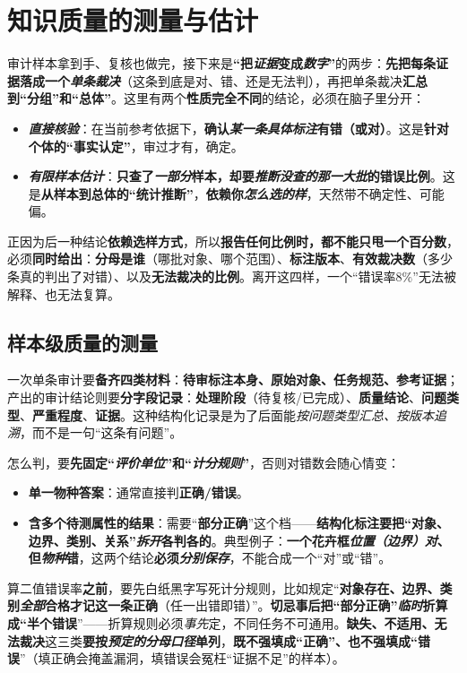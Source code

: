 \section{知识质量的测量与估计}
\label{sec:knowledge-quality-assessment-correction-measurement}

审计样本拿到手、复核也做完，接下来是\textbf{“把\emph{证据}变成\emph{数字}”}的两步：\textbf{先把每条证据落成一个\emph{单条裁决}}（这条到底是对、错、还是无法判），再把单条裁决\textbf{汇总到“分组”和“总体”}。这里有两个\textbf{性质完全不同}的结论，必须在脑子里分开：
\begin{itemize}\item \textbf{\emph{直接核验}}：在当前参考依据下，\textbf{确认\emph{某一条具体标注}有错（或对）}。这是\textbf{针对个体的“事实认定”}，审过才有，确定。\item \textbf{\emph{有限样本估计}}：\textbf{只查了\emph{一部分}样本，却要\emph{推断没查的那一大批}的错误比例}。这是\textbf{从样本到总体的“统计推断”}，\textbf{依赖你\emph{怎么选的样}}，天然带不确定性、可能偏。\end{itemize}
正因为后一种结论\textbf{依赖选样方式}，所以\textbf{报告任何比例时，都不能只甩一个百分数}，必须\textbf{同时给出}：\textbf{分母是谁}（哪批对象、哪个范围）、\textbf{标注版本}、\textbf{有效裁决数}（多少条真的判出了对错）、以及\textbf{无法裁决的比例}。离开这四样，一个“错误率$8\%$”无法被解释、也无法复算。

\subsection{样本级质量的测量}
\label{sec:knowledge-quality-assessment-correction-item-measurement}

一次单条审计要\textbf{备齐四类材料}：\textbf{待审标注本身、原始对象、任务规范、参考证据}；产出的审计结论则要\textbf{分字段记录}：\textbf{处理阶段}（待复核/已完成）、\textbf{质量结论}、\textbf{问题类型}、\textbf{严重程度}、\textbf{证据}。这种结构化记录是为了后面能\emph{按问题类型汇总、按版本追溯}，而不是一句“这条有问题”。

怎么判，要\textbf{先固定“\emph{评价单位}”和“\emph{计分规则}”}，否则对错数会随心情变：
\begin{itemize}\item \textbf{单一物种答案}：通常直接判\textbf{正确/错误}。\item \textbf{含多个待测属性的结果}：需要“\textbf{部分正确}”这个档——\textbf{结构化标注要把“对象、边界、类别、关系”\emph{拆开}各判各的}。典型例子：\textbf{一个花卉框\emph{位置（边界）对}、但\emph{物种}错}，这两个结论\textbf{必须\emph{分别保存}}，不能合成一个“对”或“错”。\end{itemize}
算二值错误率\textbf{之前}，要先白纸黑字写死计分规则，比如规定“\textbf{对象存在、边界、类别\emph{全部}合格才记这一条正确}（任一出错即错）”。\textbf{切忌事后把“部分正确”\emph{临时}折算成“半个错误}”——折算规则必须\emph{事先}定，不同任务不可通用。\textbf{缺失、不适用、无法裁决}这三类\textbf{要按\emph{预定的分母口径}单列}，\textbf{既不强填成“正确”、也不强填成“错误}”（填正确会掩盖漏洞，填错误会冤枉“证据不足”的样本）。

